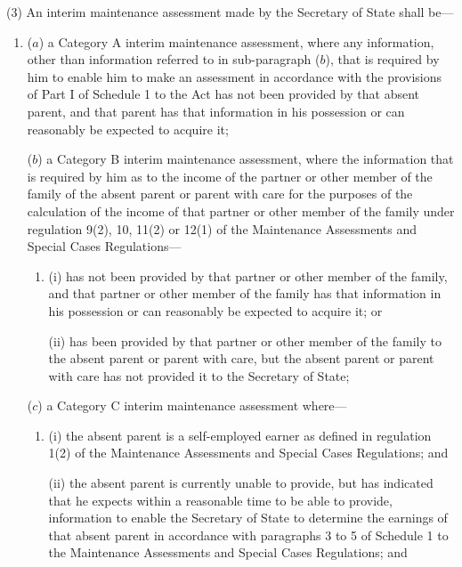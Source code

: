 \documentclass[a4paper,12pt]{article}
\begin{document}
(3) An interim maintenance assessment made by 
the Secretary of State  %
shall be—
\begin{enumerate}\item[]
($a$) a Category A interim maintenance assessment, where any information, other than information referred to in sub-paragraph ($b$), that is required by him to enable him to make an assessment in accordance with the provisions of Part I of Schedule 1 to the Act has not been provided by that absent parent, and that parent has that information in his possession or can reasonably be expected to acquire it;

($b$) a Category B interim maintenance assessment, where the information that is required by him as to the income of the partner or other member of the family of the absent parent or parent with care for the purposes of the calculation of the income of that partner or other member of the family under regulation 9(2), 10, 11(2) or 12(1) of the Maintenance Assessments and Special Cases Regulations—
\begin{enumerate}\item[]
(i) has not been provided by that partner or other member of the family, and that partner or other member of the family has that information in his possession or can reasonably be expected to acquire it; or

(ii) has been provided by that partner or other member of the family to the absent parent or parent with care, but the absent parent or parent with care has not provided it to the Secretary of State;
\end{enumerate}

($c$) a Category C interim maintenance assessment where—
\begin{enumerate}\item[]
(i) the absent parent is a self-employed earner as defined in regulation 1(2) of the Maintenance Assessments and Special Cases Regulations; and

(ii) the absent parent is currently unable to provide, but has indicated that he expects within a reasonable time to be able to provide, information to enable 
the Secretary of State  %
to determine the earnings of that absent parent in accordance with paragraphs 3 to 5 of Schedule 1 to the Maintenance Assessments and Special Cases Regulations; and


\end{enumerate}
\end{enumerate}
\end{document}
